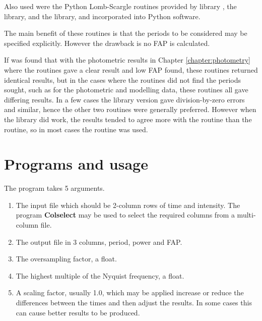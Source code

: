 Also used were the Python Lomb-Scargle routines provided by {\scipy} library \citep{jones01}, the {\astroml} library,
\citep{vanderplas12} and the {\gatspy} library, \citep{vanderplas15} and incorporated into Python software.

The main benefit of these routines is that the periods to be considered may be specified explicitly. However the
drawback is no FAP is calculated.

If was found that with the photometric results in Chapter \ref{chapter:photometry} where the {\numrecs} routines gave a
clear result and low FAP found, these routines returned identical results, but in the cases where the {\numrecs}
routines did not find the periods sought, such as for the photometric and modelling data, these routines all gave
differing results. In a few cases the {\scipy} library version gave division-by-zero errors and similar, hence the other
two routines were generally preferred. However when the {\scipy} library did work, the results tended to agree more with
the {\gatspy} routine than the {\astroml} routine, so in most cases the {\gatspy} routine was used.

\section{Programs and usage}

The {\numrecs} program takes 5 arguments.

\begin{enumerate}

\item The input file which should be 2-column rows of time and intensity. The program \textbf{Colselect} may be used to
  select the required columns from a multi-column file.

\item The output file in 3 columns, period, power and FAP.

\item The oversampling factor, a float.

\item The highest multiple of the Nyquist frequency, a float.

\item A scaling factor, usually 1.0, which may be applied increase or reduce the differences between the times and then
  adjust the results. In some cases this can cause better results to be produced.

\end{enumerate}

